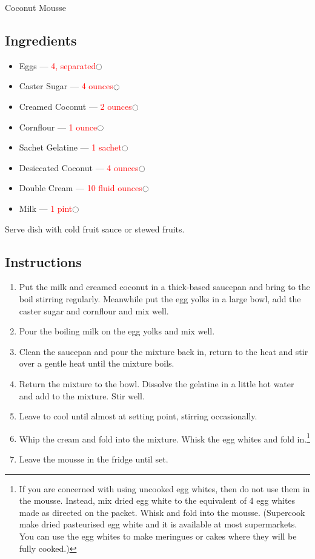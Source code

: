 \documentclass[12pt]{article}%
\newcommand{\tick}{\dotfill\(\ocircle\)}
\newcommand{\blue}[1]{\textcolor{blue!70!white}{#1}}
\newcommand{\red}[1]{\textcolor{red}{#1}}
\newcommand{\quant}[1]{\red{#1}\tick}
\begin{document}
\vspace*{\baselineskip}

{\LARGE \blue{Coconut Mousse}}%

\vspace{-\baselineskip}\hrulefill

\subsection*{Ingredients}

\begin{itemize}[nolistsep]
    \item Eggs --- \quant{4, separated}
    \item Caster Sugar --- \quant{4 ounces}
    \item Creamed Coconut --- \quant{2 ounces}
    \item Cornflour --- \quant{1 ounce}
    \item Sachet Gelatine --- \quant{1 sachet}
    \item Desiccated Coconut --- \quant{4 ounces}
    \item Double Cream --- \quant{10 fluid ounces}
    \item Milk --- \quant{1 pint}
\end{itemize}

Serve dish with cold fruit sauce or stewed fruits.

\subsection*{Instructions}

\begin{enumerate}
    \item Put the \blue{milk} and \blue{creamed coconut} in a thick-based saucepan and bring to the boil stirring regularly. Meanwhile put the \blue{egg yolks} in a large bowl, add the \blue{caster sugar} and \blue{cornflour} and mix well.
    \item Pour the boiling milk on the egg yolks and mix well.
    \item Clean the saucepan and pour the mixture back in, return to the heat and stir over a gentle heat until the mixture boils.
    \item Return the mixture to the bowl. Dissolve the \blue{gelatine} in a little hot water and add to the mixture. Stir well.
    \item Leave to cool until almost at setting point, stirring occasionally.
    \item Whip the \blue{cream} and fold into the mixture. Whisk the \blue{egg whites} and fold in.\footnote{If you are concerned with using uncooked egg whites, then do not use them in the mousse. Instead, mix \blue{dried egg white} to the equivalent of 4 egg whites made as directed on the packet. Whisk and fold into the mousse. (Supercook make dried pasteurised egg white and it is available at most supermarkets. You can use the egg whites to make meringues or cakes where they will be fully cooked.)}
    \item Leave the mousse in the fridge until set.
\end{enumerate}
\end{document}
